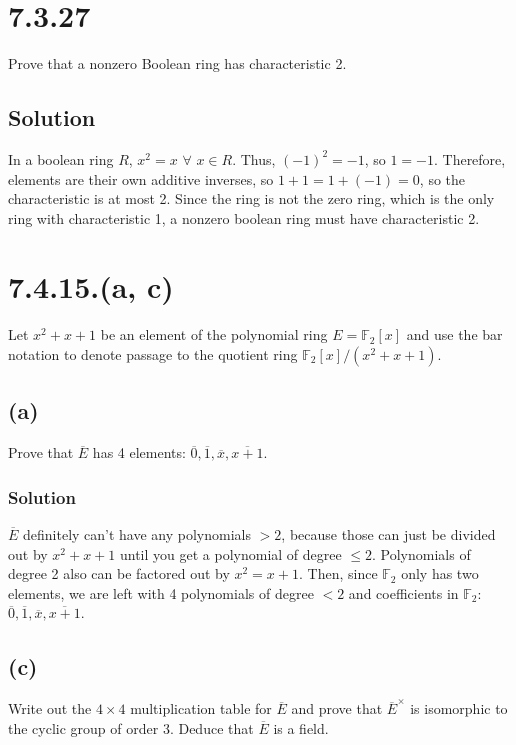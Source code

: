 \documentclass[fleqn]{article}
\begin{document}
    \section{7.3.27}
    Prove that a nonzero Boolean ring has characteristic 2.
        
        \subsection{Solution}
        In a boolean ring $R$, $x^2 = x$ $\forall$ $x \in R$.  Thus, $(-1)^2 = -1$, so $1 = -1$.  Therefore, elements are their own additive inverses, so $1 + 1 = 1 + (-1) = 0$, so the characteristic is at most 2.  Since the ring is not the zero ring, which is the only ring with characteristic 1, a nonzero boolean ring must have characteristic 2.
    
    \section{7.4.15.(a, c)}
    Let $x^2 + x + 1$ be an element of the polynomial ring $E = \mathbb{F}_2[x]$ and use the bar notation to denote passage to the quotient ring $\mathbb{F}_2[x] / (x^2 + x + 1)$.
    
        \subsection{(a)}
        Prove that $\overline{E}$ has 4 elements: $\overline{0}, \overline{1}, \overline{x}, \overline{x + 1}$.
            
            \subsubsection{Solution}
            $\overline{E}$ definitely can't have any polynomials $> 2$, because those can just be divided out by $x^2 + x + 1$ until you get a polynomial of degree $\leq 2$.  Polynomials of degree 2 also can be factored out by $x^2 = x + 1$.  Then, since $\mathbb{F}_2$ only has two elements, we are left with 4 polynomials of degree $< 2$ and coefficients in $\mathbb{F}_2$: $\overline{0}, \overline{1}, \overline{x}, \overline{x + 1}$.
        
        \subsection{(c)}
        Write out the $4 \times 4$ multiplication table for $\overline{E}$ and prove that $\overline{E}^\times$ is isomorphic to the cyclic group of order 3.  Deduce that $\overline{E}$ is a field.
        
\end{document}
